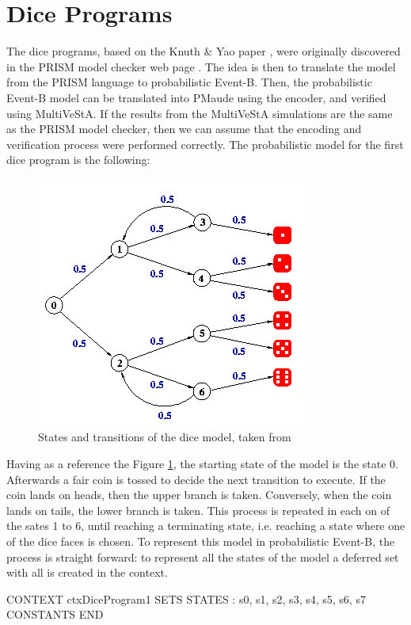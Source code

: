 \section{Dice Programs}
The dice programs, based on the Knuth \& Yao paper \cite{knuth}, were originally discovered in the PRISM model checker web page \cite{PRISMDICE}. The idea is then to translate the model from the PRISM language to probabilistic Event-B. Then, the probabilistic Event-B model can be translated into PMaude using the encoder, and verified using MultiVeStA. If the results from the MultiVeStA simulations are the same as the PRISM model checker, then we can assume that the encoding and verification process were performed correctly. The probabilistic model for the first dice program is the following:
\begin{figure}[H]
    \centering
    \includegraphics[scale = 0.5]{images/CE1.png}
    \caption{States and transitions of the dice model, taken from \cite{PRISMDICE}}
    \label{fig:ce1}
\end{figure}
Having as a reference the Figure \ref{fig:ce1}, the starting state of the model is the state 0. Afterwards a fair coin is tossed to decide the next transition to execute. If the coin lands on heads, then the upper branch is taken. Conversely, when the coin lands on tails, the lower branch is taken. This process is repeated in each on of the sates 1 to 6, until reaching a terminating state, i.e. reaching a state where one of the dice faces is chosen. To represent this model in probabilistic Event-B, the process is straight forward: to represent all the states of the model a deferred set with all is created in the context.
\begin{maude}

CONTEXT ctxDiceProgram1
SETS 
    STATES : { s0, s1, s2, s3, s4, s5, s6, s7 }
CONSTANTS 
END
\end{maude}
